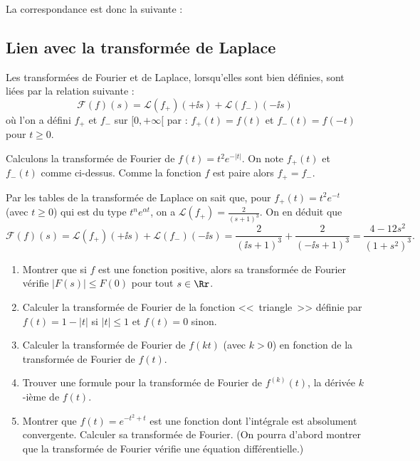 \documentclass[class=report,crop=false]{standalone}
\begin{document}
La correspondance est donc la suivante :


\subsection{Lien avec la transformée de Laplace}

Les transformées de Fourier et de Laplace, lorsqu'elles sont bien définies, 
sont liées par la relation suivante :
$$\mathcal{F}(f)(s) = \mathcal{L}(f_+)(+\ii s) + \mathcal{L}(f_-)(-\ii s)$$
où l'on a défini $f_+$ et $f_-$ sur $[0,+\infty[$ par :
$f_+(t) = f(t)$ et $f_-(t) = f(-t)$ pour $t\ge0$. 
         
            
\begin{exemple}
Calculons la transformée de Fourier de $f(t) = t^2 e^{-|t|}$.
On note $f_+(t)$ et $f_-(t)$ comme ci-dessus. Comme la fonction 
$f$ est paire alors $f_+=f_-$. 

Par les tables de la transformée de Laplace on sait que, pour
$f_+(t) = t^2e^{-t}$ (avec $t\ge 0$) qui est du type $t^ne^{\alpha t}$, on a 
$\mathcal{L}(f_+) = \frac{2}{(s+1)^3}$.
On en déduit que 
$$\mathcal{F}(f)(s) = \mathcal{L}(f_+)(+\ii s) + \mathcal{L}(f_-)(-\ii s)
= \frac{2}{(\ii s+1)^3} + \frac{2}{(-\ii s+1)^3}
= \frac{4-12s^2}{(1+s^2)^3}.$$
\end{exemple}
      



\begin{miniexercices}
\begin{enumerate}

  \item Montrer que si $f$ est une fonction positive, alors sa transformée de Fourier vérifie
  $\big| F(s) \big| \le F(0)$ pour tout $s \in \Rr$.
  
  \item Calculer la transformée de Fourier de la fonction <<~triangle~>> définie
  par $f(t) = 1-|t|$ si $|t| \le 1$ et $f(t) = 0$ sinon.
  
  \item Calculer la transformée de Fourier de $f(kt)$ (avec $k>0$)
  en fonction de la transformée de Fourier de $f(t)$.
  
  \item Trouver une formule pour la transformée de Fourier de $f^{(k)}(t)$,
  la dérivée $k$-ième de $f(t)$.
  
  \item Montrer que $f(t) = e^{-t^2+t}$ est une fonction dont l'intégrale est 
  absolument convergente. Calculer sa transformée de Fourier. (On pourra d'abord montrer que la transformée
  de Fourier vérifie une équation différentielle.)
\end{enumerate}
\end{miniexercices}
\end{document}
